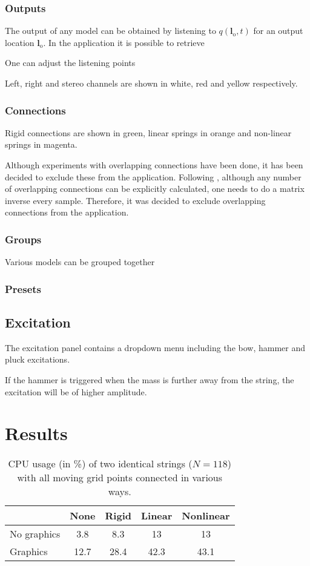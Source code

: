 \documentclass{article}
\begin{document}
\subsubsection{Outputs}
The output of any model can be obtained by listening to $q(\boldsymbol{l}_\text{o}, t)$ for an output location $\boldsymbol{l}_\text{o}$. In the application it is possible to retrieve 

One can adjust the listening points 

Left, right and stereo channels are shown in white, red and yellow respectively. 

\subsubsection{Connections}
Rigid connections are shown in green, linear springs in orange and non-linear springs in magenta. 

Although experiments with overlapping connections have been done, it has been decided to exclude these from the application. Following \cite{Bilbao2009Modular}, although any number of overlapping connections can be explicitly calculated, one needs to do a matrix inverse every sample. Therefore, it was decided to exclude overlapping connections from the application. 


\subsubsection{Groups}
Various models can be grouped together
\subsubsection{Presets}

\subsection{Excitation}
The excitation panel contains a dropdown menu including the bow, hammer and pluck excitations.

If the hammer is triggered when the mass is further away from the string, the excitation will be of higher amplitude.


\section{Results}

\begin{table}[]
    \centering
    \begin{tabular}{|l|c|c|c|c|}
        \hline  & None & Rigid & Linear & Nonlinear \\\hline
        No graphics & 3.8 & 8.3 & 13 & 13\\
        Graphics & 12.7 & 28.4 & 42.3 & 43.1\\\hline
    \end{tabular}
    \caption{CPU usage (in \%) of two identical strings ($N=118$) with all moving grid points connected in various ways.}
    \label{tab:CPU}
\end{table}
\end{document}
